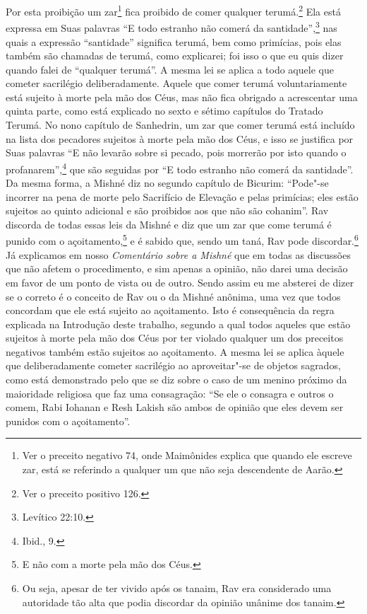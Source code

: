 \begin{multicols}{2}
Por esta proibição um zar\starr\footnote{Ver o preceito negativo 74, onde Maimônides explica que quando ele
  escreve zar\starr, está se referindo a qualquer um que não seja
  descendente de Aarão.} fica proibido de
comer qualquer terumá\starr.\footnote{Ver o preceito positivo 126.} Ela está expressa em
Suas palavras ``E todo estranho não comerá
da santidade'',\footnote{Levítico 22:10.} nas quais a expressão ``santidade''
significa terumá\starr, bem como primícias, pois elas também são chamadas
de terumá\starr, como explicarei; foi isso o que eu quis dizer quando
falei de ``qualquer terumá\starr''.
A mesma lei se aplica a todo aquele que cometer sacrilégio
deliberadamente.
Aquele que comer terumá\starr{} voluntariamente está sujeito à morte
pela mão dos Céus, mas não fica obrigado a acrescentar uma quinta parte,
como está explicado no sexto e sétimo capítulos do Tratado Terumá\starr. No
nono capítulo de Sanhedrin\starr, um zar\starr{} que comer terumá\starr{} está incluído na
lista dos
pecadores sujeitos à morte pela mão dos Céus, e isso se justifica por
Suas palavras ``E não levarão sobre si pecado, pois morrerão por isto
quando o profanarem'',\footnote{Ibid., 9.} que são seguidas por ``E todo estranho
não comerá da santidade''. Da mesma forma, a Mishné diz no segundo
capítulo de Bicurim\starr: ``Pode"-se incorrer na pena de morte pelo Sacrifício de Elevação e pelas primícias; eles
estão sujeitos ao quinto adicional e são proibidos aos que não são
cohanim\starr''.
Rav discorda de todas essas leis da Mishné e diz que um zar\starr{} que
come terumá\starr{} é punido com o açoitamento,\footnote{E não com a morte pela mão dos Céus.} e é
sabido que, sendo um taná\starr, Rav pode discordar.\footnote{Ou seja, apesar de ter vivido após os tanaim\starr, Rav era considerado uma autoridade tão
  alta que podia discordar da opinião unânime dos tanaim\starr.} Já
explicamos em nosso \emph{Comentário sobre a Mishné} que em todas as
discussões que não afetem o procedimento, e sim apenas a opinião, não darei uma decisão em favor de um ponto de vista ou de
outro. Sendo assim eu me absterei de dizer se o correto é o conceito de
Rav ou o da Mishné anônima, uma vez que todos concordam que ele está
sujeito ao açoitamento. Isto é consequência da regra explicada na
Introdução deste trabalho, segundo a qual todos aqueles que estão
sujeitos à morte pela mão dos Céus por ter violado qualquer um dos
preceitos negativos também estão sujeitos ao açoitamento. A mesma lei se
aplica àquele que deliberadamente cometer sacrilégio ao aproveitar"-se
de objetos sagrados, como está demonstrado pelo que se diz sobre o caso
de um menino próximo da maioridade religiosa que faz uma consagração:
``Se ele o consagra e outros o comem, Rabi Iohanan\starr{} e Resh Lakish\starr{} são
ambos de opinião que eles devem ser punidos com o açoitamento''.


\end{multicols}
